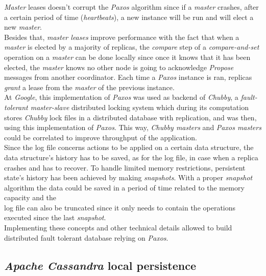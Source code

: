 \documentclass[a4paper]{report}
\newcommand{\ca}{\emph{Apache Cassandra\xspace}}
\newcommand{\px}{\emph{Paxos\xspace}}
\begin{document}
\emph{Master} leases doesn't corrupt the \px{} algorithm since if a \emph{master} crashes, after a certain period of time (\emph{heartbeats}), a new instance will be run and will elect a new \emph{master}.\\
Besides that, \emph{master leases} improve performance with the fact that when a \emph{master} is elected by a majority of replicas, the \emph{compare} step of a \emph{compare-and-set} operation on a \emph{master} can be done locally since once it knows that it has been elected, the \emph{master} knows no other node is going to acknowledge \emph{Propose} messages from another coordinator. Each time a \px{} instance is ran, replicas \emph{grant} a lease from the \emph{master} of the previous instance.\\
At \emph{Google}, this implementation of \px{} was used as backend of \emph{Chubby}, a \emph{fault-tolerant master-slave} distributed locking system which during its computation stores \emph{Chubby} lock files in a distributed database with replication, and was then, using this implementation of \px{}. This way, \emph{Chubby masters} and \emph{Paxos masters} could be correlated to improve throughput of the application.\\
Since the log file concerns actions to be applied on a certain data structure, the data structure's history has to be saved, as for the log file, in case when a replica crashes and has to recover. To handle limited memory restrictions, persistent state's history has been achieved by making \emph{snapshots}. With a proper \emph{snapshot} algorithm the data could be saved in a period of time related to the memory capacity and the \\
log file can also be truncated since it only needs to contain the operations executed since the last \emph{snapshot}.\\
Implementing these concepts and other technical details allowed to build distributed fault tolerant database relying on \px{}.

\subsection{\ca{} local persistence} %
\label{sub:ca_local_persitency}
\end{document}
